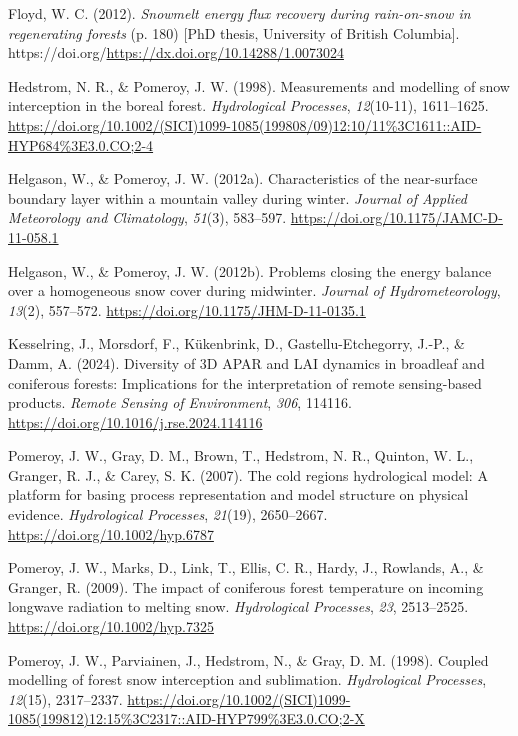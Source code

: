 \documentclass[
  letterpaper,
  DIV=11,
  numbers=noendperiod]{scrartcl}
\newlength{\cslhangindent}
\newenvironment{CSLReferences}[2] %
 {\begin{list}{}{%
  \setlength{\itemindent}{0pt}
  \setlength{\leftmargin}{0pt}
  \setlength{\parsep}{0pt}
  \ifodd #1
   \setlength{\leftmargin}{\cslhangindent}
   \setlength{\itemindent}{-1\cslhangindent}
  \fi
  \setlength{\itemsep}{#2\baselineskip}}}
 {\end{list}}
\begin{document}
\begin{CSLReferences}{1}{0}
Floyd, W. C. (2012). \emph{Snowmelt energy flux recovery during
rain-on-snow in regenerating forests} (p. 180) {[}PhD thesis, University
of British Columbia{]}.
https://doi.org/\url{https://dx.doi.org/10.14288/1.0073024}

Hedstrom, N. R., \& Pomeroy, J. W. (1998). Measurements and modelling of
snow interception in the boreal forest. \emph{Hydrological Processes},
\emph{12}(10-11), 1611--1625.
\url{https://doi.org/10.1002/(SICI)1099-1085(199808/09)12:10/11\%3C1611::AID-HYP684\%3E3.0.CO;2-4}

Helgason, W., \& Pomeroy, J. W. (2012a). Characteristics of the
near-surface boundary layer within a mountain valley during winter.
\emph{Journal of Applied Meteorology and Climatology}, \emph{51}(3),
583--597. \url{https://doi.org/10.1175/JAMC-D-11-058.1}

Helgason, W., \& Pomeroy, J. W. (2012b). Problems closing the energy
balance over a homogeneous snow cover during midwinter. \emph{Journal of
Hydrometeorology}, \emph{13}(2), 557--572.
\url{https://doi.org/10.1175/JHM-D-11-0135.1}

Kesselring, J., Morsdorf, F., Kükenbrink, D., Gastellu-Etchegorry,
J.-P., \& Damm, A. (2024). Diversity of {3D APAR} and {LAI} dynamics in
broadleaf and coniferous forests: {Implications} for the interpretation
of remote sensing-based products. \emph{Remote Sensing of Environment},
\emph{306}, 114116. \url{https://doi.org/10.1016/j.rse.2024.114116}

Pomeroy, J. W., Gray, D. M., Brown, T., Hedstrom, N. R., Quinton, W. L.,
Granger, R. J., \& Carey, S. K. (2007). The cold regions hydrological
model: A platform for basing process representation and model structure
on physical evidence. \emph{Hydrological Processes}, \emph{21}(19),
2650--2667. \url{https://doi.org/10.1002/hyp.6787}

Pomeroy, J. W., Marks, D., Link, T., Ellis, C. R., Hardy, J., Rowlands,
A., \& Granger, R. (2009). The impact of coniferous forest temperature
on incoming longwave radiation to melting snow. \emph{Hydrological
Processes}, \emph{23}, 2513--2525.
\url{https://doi.org/10.1002/hyp.7325}

Pomeroy, J. W., Parviainen, J., Hedstrom, N., \& Gray, D. M. (1998).
Coupled modelling of forest snow interception and sublimation.
\emph{Hydrological Processes}, \emph{12}(15), 2317--2337.
\url{https://doi.org/10.1002/(SICI)1099-1085(199812)12:15\%3C2317::AID-HYP799\%3E3.0.CO;2-X}


\end{CSLReferences}
\end{document}
